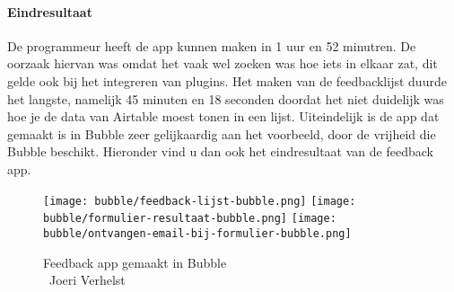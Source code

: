 \paragraph*{Eindresultaat}
De programmeur heeft de app kunnen maken in 1 uur en 52 minutren. De oorzaak hiervan was omdat het vaak wel zoeken was hoe iets in elkaar zat, dit gelde ook bij het integreren van plugins.
Het maken van de feedbacklijst duurde het langste, namelijk 45 minuten en 18 seconden doordat het niet duidelijk was hoe je de data van Airtable moest tonen in een lijst.
Uiteindelijk is de app dat gemaakt is in Bubble zeer gelijkaardig aan het voorbeeld, door de vrijheid die Bubble beschikt. Hieronder vind u dan ook het eindresultaat van de feedback app.
\\
\begin{figure}[H]
    \texttt{[image: bubble/feedback-lijst-bubble.png]}
    \texttt{[image: bubble/formulier-resultaat-bubble.png]}
    \texttt{[image: bubble/ontvangen-email-bij-formulier-bubble.png]}
    \caption[Feedback app gemaakt in Bubble]{Feedback app gemaakt in Bubble\\\textcopyright\ Joeri Verhelst}
    \label{fig:feedback-app-bubble}
\end{figure}

